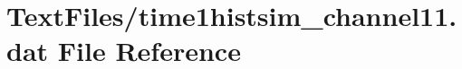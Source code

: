 \hypertarget{TextFiles_2time1histsim__channel11_8dat}{}\section{Text\+Files/time1histsim\+\_\+channel11.dat File Reference}
\label{TextFiles_2time1histsim__channel11_8dat}
